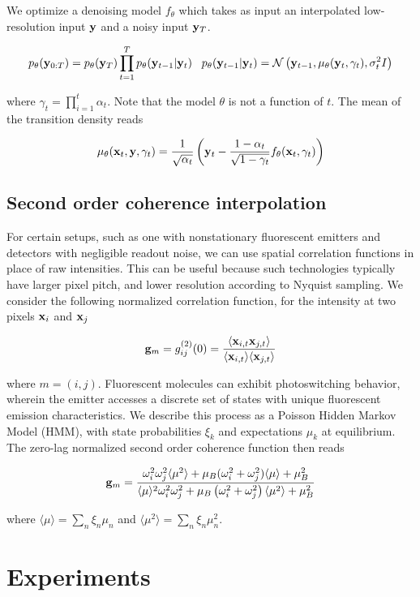 \documentclass{article}
\begin{document}
We optimize a denoising model $f_{\theta}$ which takes as input an interpolated low-resolution input $\bold{y}$ and a noisy input $\bold{y}_{T}$. 

\begin{equation}
p_{\theta}(\bold{y}_{0:T}) = p_{\theta}(\bold{y}_{T})\prod_{t=1}^{T} p_{\theta}(\bold{y}_{t-1}|\bold{y}_{t}) \;\;\; p_{\theta}(\bold{y}_{t-1}|\bold{y}_{t}) = \mathcal{N}\left(\bold{y}_{t-1},\mu_{\theta}(\bold{y}_{t},\gamma_{t}),\sigma^{2}_{t}I\right)
\end{equation}

where $\gamma_{t}=\prod_{i=1}^{t}\alpha_{t}$. Note that the model $\theta$ is not a function of $t$. The mean of the transition density reads

\begin{equation}
\mu_{\theta}(\bold{x}_{t},\bold{y},\gamma_{t}) = \frac{1}{\sqrt{\alpha_{t}}}\left(\bold{y}_t-\frac{1-\alpha_{t}}{\sqrt{1-\gamma_{t}}}f_{\theta}(\bold{x}_{t},\gamma_{t})\right)
\end{equation}

\subsection{Second order coherence interpolation}

For certain setups, such as one with nonstationary fluorescent emitters and detectors with negligible readout noise, we can use spatial correlation functions in place of raw intensities. This can be useful because such technologies typically have larger pixel pitch, and lower resolution according to Nyquist sampling. We consider the following normalized correlation function, for the intensity at two pixels $\bold{x}_{i}$ and $\bold{x}_{j}$

\begin{equation}
\bold{g}_{m} = g^{(2)}_{ij}(0) = \frac{\langle \bold{x}_{i,t}\bold{x}_{j,t}\rangle}{\langle \bold{x}_{i,t}\rangle\langle \bold{x}_{j,t}\rangle}
\end{equation}

where $m=(i,j)$. Fluorescent molecules can exhibit photoswitching behavior, wherein the emitter accesses a discrete set of states with unique fluorescent emission characteristics. We describe this process as a Poisson Hidden Markov Model (HMM), with state probabilities $\xi_{k}$ and expectations $\mu_{k}$ at equilibrium. The zero-lag normalized second order coherence function then reads

\begin{equation}
\bold{g}_{m} = \frac{\omega_{i}^{2}\omega_{j}^{2}\langle \mu^2 \rangle + \mu_{B}(\omega_{i}^{2}+\omega_{j}^{2})\langle \mu \rangle + \mu_{B}^2}{\langle \mu \rangle^2 \omega_{i}^2 \omega_{j}^2 + \mu_{B}\left(\omega_{i}^2+\omega_{j}^2\right)\langle \mu^2 \rangle + \mu_{B}^2}
\end{equation}

where $\langle \mu \rangle = \sum_{n}\xi_n\mu_n$ and $\langle \mu^2 \rangle = \sum_{n}\xi_n\mu_n^2$. 

\section{Experiments}
\end{document}
